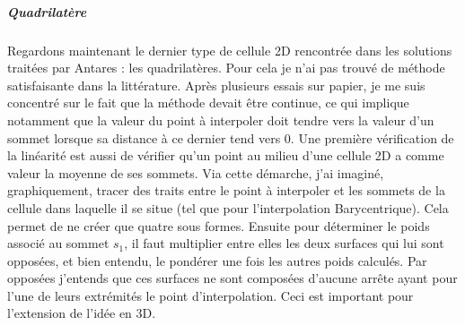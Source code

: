 \subparagraph{Quadrilatère}

Regardons maintenant le dernier type de cellule 2D rencontrée dans les solutions traitées par Antares : les quadrilatères.
Pour cela je n'ai pas trouvé de méthode satisfaisante dans la littérature\cite{perronnet1998}. Après plusieurs essais sur papier, je me suis concentré sur le fait que la méthode devait être continue, ce qui implique notamment que la valeur du point à interpoler doit tendre vers la valeur d'un sommet lorsque sa distance à ce dernier tend vers 0.
Une première vérification de la linéarité est aussi de vérifier qu'un point au milieu d'une cellule 2D a comme valeur la moyenne de ses sommets.
Via cette démarche, j'ai imaginé, graphiquement, tracer des traits entre le point à interpoler et les sommets de la cellule dans laquelle il se situe (tel que pour l'interpolation Barycentrique).
Cela permet de ne créer que quatre sous formes.
Ensuite pour déterminer le poids associé au sommet \( s_1 \), il faut multiplier entre elles les deux surfaces qui lui sont opposées, et bien entendu, le pondérer une fois les autres poids calculés.
Par opposées j'entends que ces surfaces ne sont composées d'aucune arrête ayant pour l'une de leurs extrémités le point d'interpolation. Ceci est important pour l'extension de l'idée en 3D.

